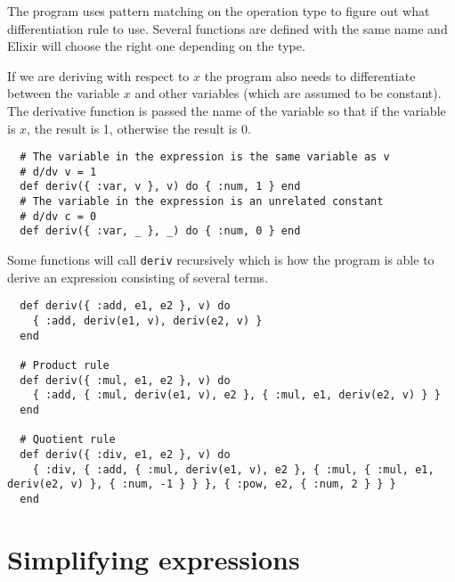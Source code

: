 \documentclass[a4paper,11pt]{article}
\begin{document}
The program uses pattern matching on the operation type to figure out what differentiation rule to use.
Several functions are defined with the same name and Elixir will choose the right one depending on the type.

If we are deriving with respect to $x$ the program also needs to differentiate between the variable $x$ and other variables (which are assumed to be constant).
The derivative function is passed the name of the variable so that if the variable is $x$, the result is 1, otherwise the result is 0.

\begin{verbatim}
  # The variable in the expression is the same variable as v
  # d/dv v = 1
  def deriv({ :var, v }, v) do { :num, 1 } end
  # The variable in the expression is an unrelated constant
  # d/dv c = 0
  def deriv({ :var, _ }, _) do { :num, 0 } end
\end{verbatim}

Some functions will call \texttt{deriv} recursively which is how the program is able to derive an expression consisting of several terms.

\begin{verbatim}
  def deriv({ :add, e1, e2 }, v) do
    { :add, deriv(e1, v), deriv(e2, v) }
  end

  # Product rule
  def deriv({ :mul, e1, e2 }, v) do
    { :add, { :mul, deriv(e1, v), e2 }, { :mul, e1, deriv(e2, v) } }
  end

  # Quotient rule
  def deriv({ :div, e1, e2 }, v) do
    { :div, { :add, { :mul, deriv(e1, v), e2 }, { :mul, { :mul, e1, deriv(e2, v) }, { :num, -1 } } }, { :pow, e2, { :num, 2 } } }
  end
\end{verbatim}

\section*{Simplifying expressions}
\end{document}
